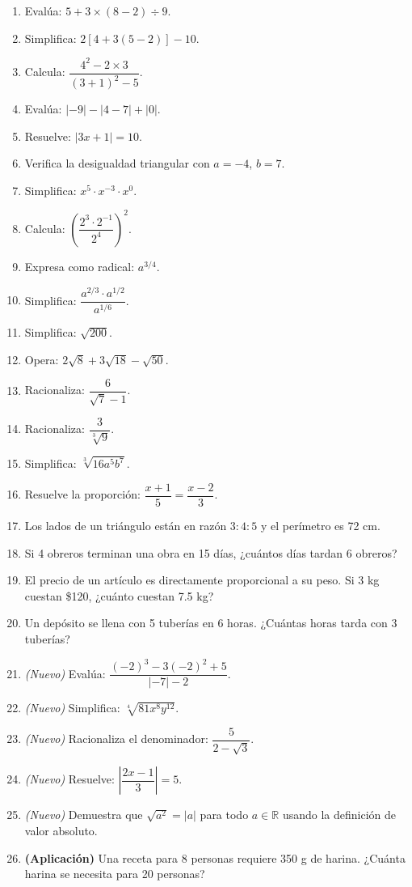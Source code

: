 \documentclass[12pt,letterpaper]{book}
\begin{document}
\begin{enumerate}
\item Evalúa: $5+3\times(8-2)\div9$.
\item Simplifica: $2[4+3(5-2)]-10$.
\item Calcula: $\dfrac{4^2-2\times3}{(3+1)^2-5}$.
\item Evalúa: $|-9|-|4-7|+|0|$.
\item Resuelve: $|3x+1|=10$.
\item Verifica la desigualdad triangular con $a=-4$, $b=7$.
\item Simplifica: $x^5\cdot x^{-3}\cdot x^0$.
\item Calcula: $\left(\dfrac{2^3\cdot2^{-1}}{2^4}\right)^2$.
\item Expresa como radical: $a^{3/4}$.
\item Simplifica: $\dfrac{a^{2/3}\cdot a^{1/2}}{a^{1/6}}$.
\item Simplifica: $\sqrt{200}$.
\item Opera: $2\sqrt8+3\sqrt{18}-\sqrt{50}$.
\item Racionaliza: $\dfrac{6}{\sqrt7-1}$.
\item Racionaliza: $\dfrac{3}{\sqrt[3]9}$.
\item Simplifica: $\sqrt[3]{16a^5b^7}$.
\item Resuelve la proporción: $\dfrac{x+1}{5}=\dfrac{x-2}{3}$.
\item Los lados de un triángulo están en razón $3:4:5$ y el perímetro es 72 cm.
\item Si 4 obreros terminan una obra en 15 días, ¿cuántos días tardan 6 obreros?
\item El precio de un artículo es directamente proporcional a su peso. Si 3 kg cuestan \$120, ¿cuánto cuestan 7.5 kg?
\item Un depósito se llena con 5 tuberías en 6 horas. ¿Cuántas horas tarda con 3 tuberías?
\item \textit{(Nuevo)} Evalúa: $\dfrac{(-2)^3-3(-2)^2+5}{|-7|-2}$.
\item \textit{(Nuevo)} Simplifica: $\sqrt[4]{81x^8y^{12}}$.
\item \textit{(Nuevo)} Racionaliza el denominador: $\dfrac{5}{2-\sqrt3}$.
\item \textit{(Nuevo)} Resuelve: $\left|\dfrac{2x-1}{3}\right|=5$.
\item \textit{(Nuevo)} Demuestra que $\sqrt{a^2}=|a|$ para todo $a\in\mathbb{R}$ usando la definición de valor absoluto.
\item \textbf{(Aplicación)} Una receta para 8 personas requiere 350 g de harina. ¿Cuánta harina se necesita para 20 personas?

\end{enumerate}
\end{document}
